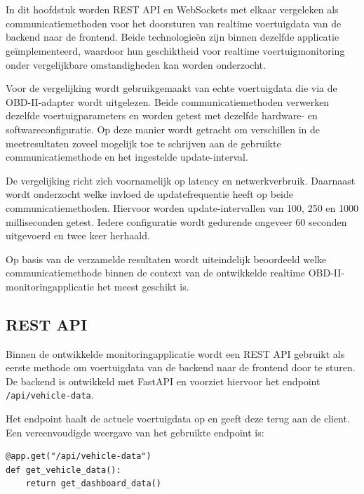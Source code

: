 \chapter{}%
\label{ch:vergelijking-van-rest-api-en-websockets}

In dit hoofdstuk worden REST API en WebSockets met elkaar vergeleken als
communicatiemethoden voor het doorsturen van realtime voertuigdata van de
backend naar de frontend. Beide technologieën zijn binnen dezelfde applicatie
geïmplementeerd, waardoor hun geschiktheid voor realtime voertuigmonitoring
onder vergelijkbare omstandigheden kan worden onderzocht.

Voor de vergelijking wordt gebruikgemaakt van echte voertuigdata die via de
OBD-II-adapter wordt uitgelezen. Beide communicatiemethoden verwerken dezelfde
voertuigparameters en worden getest met dezelfde hardware- en
softwareconfiguratie. Op deze manier wordt getracht om verschillen in de
meetresultaten zoveel mogelijk toe te schrijven aan de gebruikte
communicatiemethode en het ingestelde update-interval.

De vergelijking richt zich voornamelijk op latency en netwerkverbruik.
Daarnaast wordt onderzocht welke invloed de updatefrequentie heeft op beide
communicatiemethoden. Hiervoor worden update-intervallen van 100, 250 en
1000 milliseconden getest. Iedere configuratie wordt gedurende ongeveer
60 seconden uitgevoerd en twee keer herhaald.

Op basis van de verzamelde resultaten wordt uiteindelijk beoordeeld welke
communicatiemethode binnen de context van de ontwikkelde realtime
OBD-II-monitoringapplicatie het meest geschikt is.


\section{REST API}

Binnen de ontwikkelde monitoringapplicatie wordt een REST API gebruikt als
eerste methode om voertuigdata van de backend naar de frontend door te sturen.
De backend is ontwikkeld met FastAPI en voorziet hiervoor het endpoint
\texttt{/api/vehicle-data}.

Het endpoint haalt de actuele voertuigdata op en geeft deze terug aan de client.
Een vereenvoudigde weergave van het gebruikte endpoint is:

\begin{verbatim}
@app.get("/api/vehicle-data")
def get_vehicle_data():
    return get_dashboard_data()
\end{verbatim}

